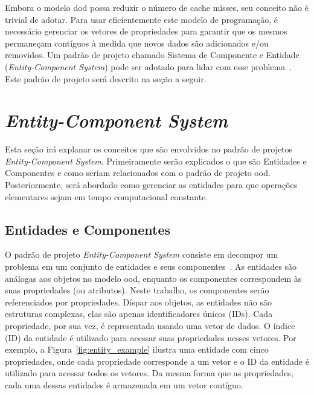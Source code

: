 Embora o modelo \ac{dod} possa reduzir o número de cache misses, seu conceito não é trivial de adotar.
Para usar eficientemente este modelo de programação, é necessário gerenciar os vetores de propriedades para garantir que os mesmos permaneçam contíguos à medida que novos dados são adicionados e/ou removidos. Um padrão de projeto chamado Sistema de Componente e Entidade (\textit{Entity-Component System}) pode ser adotado para lidar com esse problema~\cite{nystrom2014game}. Este padrão de projeto será descrito na seção a seguir.

\section{\textit{Entity-Component System}}
\label{sec:entity_component_system}

Esta seção irá explanar os conceitos que são envolvidos no padrão de projetos \textit{Entity-Component System}.
Primeiramente serão explicados o que são Entidades e Componentes e como seriam relacionados com o padrão de projeto \ac{ood}.
Posteriormente, será abordado como gerenciar as entidades para que operações elementares sejam em tempo computacional constante.

\subsection{Entidades e Componentes}

O padrão de projeto \textit{Entity-Component System} consiste em decompor um problema em um conjunto de entidades e seus componentes~\cite{nystrom2014game}. As entidades são análogas aos objetos no modelo \ac{ood}, enquanto os componentes correspondem às suas propriedades (ou atributos). Neste trabalho, os componentes serão referenciados por propriedades. Díspar aos objetos, as entidades não são estruturas complexas, elas são apenas identificadores únicos (IDs). Cada propriedade, por sua vez, é representada usando uma vetor de dados. O índice (ID) da entidade é utilizado para acessar suas propriedades nesses vetores. Por exemplo, a Figura~\ref{fig:entity_example} ilustra uma entidade com cinco propriedades, onde cada propriedade corresponde a um vetor e o ID da entidade é utilizado para acessar todos os vetores. Da mesma forma que as propriedades, cada uma dessas entidades é armazenada em um vetor contíguo.


